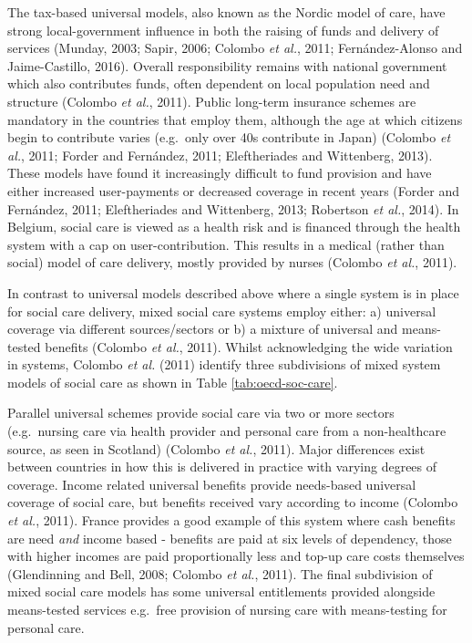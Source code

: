 \documentclass[12pt,a4paper,oneside,table]{report}
\begin{document}
The tax-based universal models, also known as the Nordic model of care,
have strong local-government influence in both the raising of funds and
delivery of services (Munday, 2003; Sapir, 2006; Colombo \emph{et al.},
2011; Fernández-Alonso and Jaime-Castillo, 2016). Overall responsibility
remains with national government which also contributes funds, often
dependent on local population need and structure (Colombo \emph{et al.},
2011). Public long-term insurance schemes are mandatory in the countries
that employ them, although the age at which citizens begin to contribute
varies (e.g.~only over 40s contribute in Japan) (Colombo \emph{et al.},
2011; Forder and Fernández, 2011; Eleftheriades and Wittenberg, 2013).
These models have found it increasingly difficult to fund provision and
have either increased user-payments or decreased coverage in recent
years (Forder and Fernández, 2011; Eleftheriades and Wittenberg, 2013;
Robertson \emph{et al.}, 2014). In Belgium, social care is viewed as a
health risk and is financed through the health system with a cap on
user-contribution. This results in a medical (rather than social) model
of care delivery, mostly provided by nurses (Colombo \emph{et al.},
2011).

In contrast to universal models described above where a single system is
in place for social care delivery, mixed social care systems employ
either: a) universal coverage via different sources/sectors or b) a
mixture of universal and means-tested benefits (Colombo \emph{et al.},
2011). Whilst acknowledging the wide variation in systems, Colombo
\textit{et al.} (2011) identify three subdivisions of mixed system
models of social care as shown in Table \ref{tab:oecd-soc-care}.

Parallel universal schemes provide social care via two or more sectors
(e.g.~nursing care via health provider and personal care from a
non-healthcare source, as seen in Scotland) (Colombo \emph{et al.},
2011). Major differences exist between countries in how this is
delivered in practice with varying degrees of coverage. Income related
universal benefits provide needs-based universal coverage of social
care, but benefits received vary according to income (Colombo \emph{et
al.}, 2011). France provides a good example of this system where cash
benefits are need \textit{and} income based - benefits are paid at six
levels of dependency, those with higher incomes are paid proportionally
less and top-up care costs themselves (Glendinning and Bell, 2008;
Colombo \emph{et al.}, 2011). The final subdivision of mixed social care
models has some universal entitlements provided alongside means-tested
services e.g.~free provision of nursing care with means-testing for
personal care.
\end{document}
